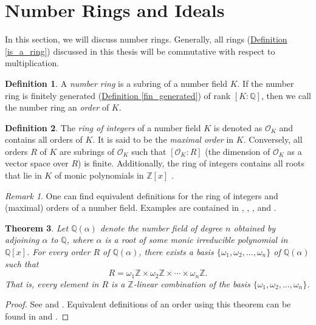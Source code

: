 \documentclass[openany, a4paper, 10pt]{book}
\theoremstyle{plain}
\newtheorem{theorem}{Theorem}[chapter]
\theoremstyle{plain}
\theoremstyle{plain}
\theoremstyle{definition}
\newtheorem{definition}[theorem]{Definition}
\theoremstyle{plain}
\theoremstyle{definition}
\theoremstyle{remark}
\newtheorem*{remark}{Remark}
\newcommand{\defref}[1]{\hyperref[#1]{Definition \ref{#1}}}
\begin{document}
\section{Number Rings and Ideals}\label{number_rings}
In this section, we will discuss number rings.
Generally, all rings (\defref{is_a_ring}) discussed in this thesis will be commutative with respect to multiplication.

\begin{definition}\label{number_ring}
    A \textit{number ring} is a subring of a number field $K$.
    If the number ring is finitely generated (\defref{fin_generated}) of rank $[K:\mathbb Q]$, then we call the number ring an \textit{order} of $K$.
\end{definition}
\begin{definition}\label{is_roi}
    The \textit{ring of integers} of a number field $K$ is denoted as $\mathcal O_K$ and contains all orders of $K$.
    It is said to be the \textit{maximal order} in $K$.
    Conversely, all orders $R$ of $K$ are subrings of $\mathcal O_K$ such that $[\mathcal O_K: R]$ (the dimension of $\mathcal O_K$ as a vector space over $R$) is finite.
    Additionally, the ring of integers contains all roots that lie in $K$ of monic polynomials in $\mathbb Z[x]$ \cite[Theorem~3.20]{ANT_dictaat}.
\end{definition}
\begin{remark}
    One can find equivalent definitions for the ring of integers and (maximal) orders of a number field.
    Examples are contained in \cite{number_rings_1}, \cite{marcus}, \cite{ANT_dictaat}, and \cite{number_rings_2}.
\end{remark}
\begin{theorem}
    Let $\mathbb Q(\alpha)$ denote the number field of degree $n$ obtained by adjoining $\alpha$ to $\mathbb Q$, where $\alpha$ is a root of some monic irreducible polynomial in $\mathbb Q[x]$.
    For every order $R$ of $\mathbb Q(\alpha)$, there exists a basis $\{ \omega_1, \omega_2, \dots, \omega_n \}$ of $\mathbb Q(\alpha)$ such that
    \begin{equation*}
        R = \omega_1\mathbb Z \times \omega_2 \mathbb Z \times \cdots \times \omega_n \mathbb Z.
    \end{equation*}
    That is, every element in $R$ is a $\mathbb Z$-linear combination of the basis $\{ \omega_1, \omega_2, \dots, \omega_n \}$.
\end{theorem}
\begin{proof}
    See \cite[Proposition~2.2]{number_rings_2} and \cite[p.~20]{ANT_dictaat}.
    Equivalent definitions of an order using this theorem can be found in \cite[pp.~212,213]{arithmetic_nr} and \cite[Definition~1]{order_ref2}.
\end{proof}
\end{document}
